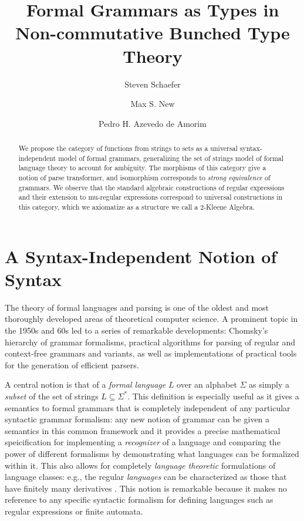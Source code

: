 \documentclass[acmsmall,anonymous,review,screen]{acmart}
\begin{document}
\title{Formal Grammars as Types in Non-commutative Bunched Type Theory}
\author{Steven Schaefer}



\author{Max S. New}

\author{Pedro H. Azevedo de Amorim}

\begin{abstract}
  We propose the category of functions from strings to sets as a
  universal syntax-independent model of formal grammars, generalizing
  the set of strings model of formal language theory to account for
  ambiguity. The morphisms of this category give a notion of parse
  transformer, and isomorphism corresponds to \emph{strong
  equivalence} of grammars. We observe that the standard algebraic
  constructions of regular expressions and their extension to
  mu-regular expressions correspond to universal constructions in this
  category, which we axiomatize as a structure we call a 2-Kleene
  Algebra.

  
\end{abstract}

\section{A Syntax-Independent Notion of Syntax}

The theory of formal languages and parsing is one of the oldest and
most thoroughly developed areas of theoretical computer science. A
prominent topic in the 1950s and 60s led to a series of remarkable
developments: Chomsky's hierarchy of grammar formalisms, practical
algorithms for parsing of regular and context-free grammars and
variants, as well as implementations of practical tools for the
generation of efficient parsers.

A central notion is that of a \emph{formal language} $L$ over an
alphabet $\Sigma$ as simply a \emph{subset} of the set of strings $L
\subseteq \Sigma^*$. This definition is especially useful as it gives
a semantics to formal grammars that is completely independent of any
particular syntactic grammar formalism: any new notion of grammar can
be given a semantics in this common framework and it provides a
precise mathematical speicification for implementing a
\emph{recognizer} of a language and comparing the power of different
formalisms by demonstrating what languages can be formalized within
it. This also allows for completely \emph{language theoretic}
formulations of language classes: e.g., the regular \emph{languages}
can be characterized as those that have finitely many derivatives
\cite{brzozowski-or-myhill-nerode-idk}. This notion is remarkable
because it makes no reference to any specific syntactic formalism for
defining languages such as regular expressions or finite automata.
\end{document}
